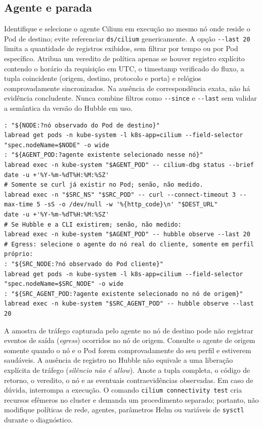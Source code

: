 \documentclass[12pt,openany,oneside,a4paper,chapter=TITLE,english,brazil]{abntex2}
\begin{document}
\begin{apendicesenv}
\section*{Agente e parada}\label{agente-e-parada}

Identifique e selecione o agente Cilium em execução no mesmo nó onde reside o Pod de destino; evite referenciar \texttt{ds/\allowbreak{}cilium} genericamente. A opção \texttt{-{}\allowbreak{}-{}\allowbreak{}last 20} limita a quantidade de registros exibidos, sem filtrar por tempo ou por Pod específico. Atribua um veredito de política apenas se houver registro explícito contendo o horário da requisição em UTC, o timestamp verificado do fluxo, a tupla coincidente (origem, destino, protocolo e porta) e relógios comprovadamente sincronizados. Na ausência de correspondência exata, não há evidência concludente. Nunca combine filtros como \texttt{-{}\allowbreak{}-{}\allowbreak{}since} e \texttt{-{}\allowbreak{}-{}\allowbreak{}last} sem validar a semântica da versão do Hubble em uso.

\begin{verbatim}
: "${NODE:?nó observado do Pod de destino}"
labread get pods -n kube-system -l k8s-app=cilium --field-selector "spec.nodeName=$NODE" -o wide
: "${AGENT_POD:?agente existente selecionado nesse nó}"
labread exec -n kube-system "$AGENT_POD" -- cilium-dbg status --brief
date -u +'%Y-%m-%dT%H:%M:%SZ'
# Somente se curl já existir no Pod; senão, não medido.
labread exec -n "$SRC_NS" "$SRC_POD" -- curl --connect-timeout 3 --max-time 5 -sS -o /dev/null -w '%{http_code}\n' "$DEST_URL"
date -u +'%Y-%m-%dT%H:%M:%SZ'
# Se Hubble e a CLI existirem; senão, não medido:
labread exec -n kube-system "$AGENT_POD" -- hubble observe --last 20
# Egress: selecione o agente do nó real do cliente, somente em perfil próprio:
: "${SRC_NODE:?nó observado do Pod cliente}"
labread get pods -n kube-system -l k8s-app=cilium --field-selector "spec.nodeName=$SRC_NODE" -o wide
: "${SRC_AGENT_POD:?agente existente selecionado no nó de origem}"
labread exec -n kube-system "$SRC_AGENT_POD" -- hubble observe --last 20
\end{verbatim}

A amostra de tráfego capturada pelo agente no nó de destino pode não registrar eventos de saída (\emph{egress}) ocorridos no nó de origem. Consulte o agente de origem somente quando o nó e o Pod forem comprovadamente do seu perfil e estiverem saudáveis. A ausência de registro no Hubble não equivale a uma liberação explícita de tráfego (\emph{silêncio não é allow}). Anote a tupla completa, o código de retorno, o veredito, o nó e as eventuais contraevidências observadas. Em caso de dúvida, interrompa a execução. O comando \texttt{cilium connectivity test} cria recursos efêmeros no cluster e demanda um procedimento separado; portanto, não modifique políticas de rede, agentes, parâmetros Helm ou variáveis de \texttt{sysctl} durante o diagnóstico.

\end{apendicesenv}
\end{document}
